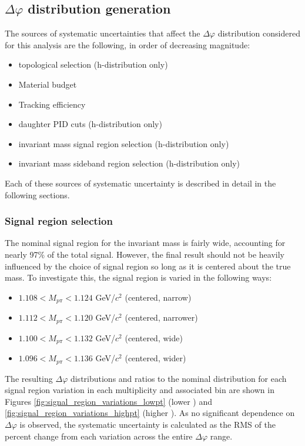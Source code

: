 \subsection{$\Delta\varphi$ distribution generation}
\label{sec:systematics_dphi}
The sources of systematic uncertainties that affect the $\Delta\varphi$ distribution considered for this analysis are the following, in order of decreasing magnitude:
%
\begin{itemize}
\item \lmb topological selection (h-\lmb distribution only)
\item Material budget
\item Tracking efficiency
\item \lmb daughter PID cuts (h-\lmb distribution only)
\item \lmb invariant mass signal region selection (h-\lmb distribution only)
\item \lmb invariant mass sideband region selection (h-\lmb distribution only)
\end{itemize}
%
Each of these sources of systematic uncertainty is described in detail in the following sections.

\subsubsection{Signal region selection}
The nominal signal region for the \lmb invariant mass is fairly wide, accounting for nearly 97\% of the total \lmb signal.  However, the final result should not be heavily influenced by the choice of signal region so long as it is centered about the true \lmb mass. To investigate this, the signal region is varied in the following ways:
%
\begin{itemize}
\item $1.108 < M_{p\pi} < 1.124$ GeV/$c^2$ (centered, narrow)
\item $1.112 < M_{p\pi} < 1.120$ GeV/$c^2$ (centered, narrower)
\item $1.100 < M_{p\pi} < 1.132$ GeV/$c^2$ (centered, wide)
\item $1.096 < M_{p\pi} < 1.136$ GeV/$c^2$ (centered, wider)
\end{itemize}
%
The resulting $\Delta\varphi$ distributions and ratios to the nominal distribution for each signal region variation in each multiplicity and associated \pt bin are shown in Figures \ref{fig:signal_region_variations_lowpt} (lower \pt) and \ref{fig:signal_region_variations_highpt} (higher \pt). As no significant dependence on $\Delta\varphi$ is observed, the systematic uncertainty is calculated as the RMS of the percent change from each variation across the entire $\Delta\varphi$ range.

